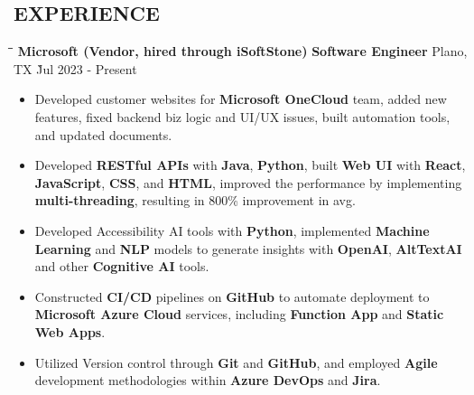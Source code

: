 \documentclass{res}
\begin{document}
\begin{resume}
\section{EXPERIENCE}
    \vspace{0.00in}	
    \begin{tabbing}
    \hspace{3.66in}\= \hspace{1.5in}\= \hspace{1.6in}\= \kill %
    {\bf Microsoft (Vendor, hired through iSoftStone)} \> {\bf Software Engineer}  \>  
                                    Plano, TX    \` Jul 2023 - Present\\
    \end{tabbing}\vspace{-20pt}      %
    \vspace{+0.1in}
    \begin{itemize} \itemsep 1.5pt %
    \item Developed customer websites for {\bf Microsoft OneCloud} team, added new features, 
        fixed backend biz logic and UI/UX issues, built automation tools, and updated documents.
    \item Developed {\bf RESTful APIs} with {\bf Java}, {\bf Python}, built {\bf Web UI} with 
        {\bf React}, {\bf JavaScript}, {\bf CSS}, and {\bf HTML}, improved the performance by 
        implementing {\bf multi-threading}, resulting in 800\% improvement in avg.
    \item Developed Accessibility AI tools with {\bf Python}, implemented {\bf Machine Learning} 
        and {\bf NLP} models to generate insights with {\bf OpenAI}, {\bf AltTextAI} and other 
        {\bf Cognitive AI} tools.
    \item Constructed {\bf CI/CD} pipelines on {\bf GitHub} to automate deployment to 
        {\bf Microsoft Azure Cloud} services, including {\bf Function App} and {\bf Static Web Apps}.
    \item Utilized Version control through {\bf Git} and {\bf GitHub}, and employed {\bf Agile} 
        development methodologies within {\bf Azure DevOps} and {\bf Jira}.
    \end{itemize}



\end{resume}
\end{document}
